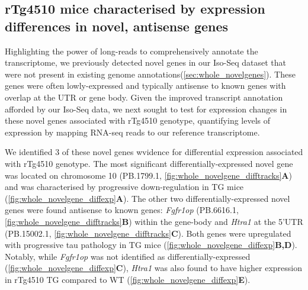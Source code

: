 \clearpage
\subsection{rTg4510 mice characterised by expression differences in novel, antisense genes}
Highlighting the power of long-reads to comprehensively annotate the transcriptome, we previously detected novel genes in our Iso-Seq dataset that were not present in existing genome annotations(\cref{sec:whole_novelgenes}). These genes were often lowly-expressed and typically antisense to known genes with overlap at the UTR or gene body. Given the improved transcript annotation afforded by our Iso-Seq data, we next sought to test for expression changes in these novel genes associated with rTg4510 genotype, quantifying levels of expression by mapping RNA-seq reads to our reference transcriptome. 

We identified 3 of these novel genes wvidence for differential expression associated with rTg4510 genotype. The most significant differentially-expressed novel gene was located on chromosome 10 (PB.1799.1, \cref{fig:whole_novelgene_difftracks}\textbf{A}) and was characterised by progressive down-regulation in TG mice (\cref{fig:whole_novelgene_diffexp}\textbf{A}). The other two differentially-expressed novel genes were found antisense to known genes: \textit{Fgfr1op} (PB.6616.1, \cref{fig:whole_novelgene_difftracks}\textbf{B}) within the gene-body and \textit{Htra1} at the 5'UTR (PB.15002.1, \cref{fig:whole_novelgene_difftracks}\textbf{C}). Both genes were upregulated with progressive tau pathology in TG mice (\cref{fig:whole_novelgene_diffexp}\textbf{B,D}). Notably, while \textit{Fgfr1op} was not identified as differentially-expressed (\cref{fig:whole_novelgene_diffexp}\textbf{C}), \textit{Htra1} was also found to have higher expression in rTg4510 TG compared to WT (\cref{fig:whole_novelgene_diffexp}\textbf{E}).     

